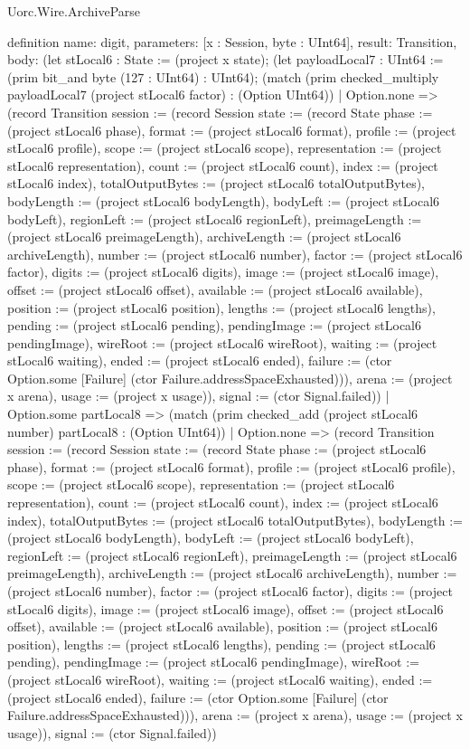 \begin{lexlean}{Uorc.Wire.ArchiveParse}
\begin{semanticmodule}
definition{
  name: digit,
  parameters: [x : Session, byte : UInt64],
  result: Transition,
  body: (let stLocal6 : State := (project x state); (let payloadLocal7 : UInt64 := (prim bit_and byte (127 : UInt64) : UInt64); (match (prim checked_multiply payloadLocal7 (project stLocal6 factor) : (Option UInt64))
    | Option.none => (record Transition {session := (record Session {state := (record State {phase := (project stLocal6 phase), format := (project stLocal6 format), profile := (project stLocal6 profile), scope := (project stLocal6 scope), representation := (project stLocal6 representation), count := (project stLocal6 count), index := (project stLocal6 index), totalOutputBytes := (project stLocal6 totalOutputBytes), bodyLength := (project stLocal6 bodyLength), bodyLeft := (project stLocal6 bodyLeft), regionLeft := (project stLocal6 regionLeft), preimageLength := (project stLocal6 preimageLength), archiveLength := (project stLocal6 archiveLength), number := (project stLocal6 number), factor := (project stLocal6 factor), digits := (project stLocal6 digits), image := (project stLocal6 image), offset := (project stLocal6 offset), available := (project stLocal6 available), position := (project stLocal6 position), lengths := (project stLocal6 lengths), pending := (project stLocal6 pending), pendingImage := (project stLocal6 pendingImage), wireRoot := (project stLocal6 wireRoot), waiting := (project stLocal6 waiting), ended := (project stLocal6 ended), failure := (ctor Option.some [Failure] (ctor Failure.addressSpaceExhausted))}), arena := (project x arena), usage := (project x usage)}), signal := (ctor Signal.failed)})
    | Option.some partLocal8 => (match (prim checked_add (project stLocal6 number) partLocal8 : (Option UInt64))
      | Option.none => (record Transition {session := (record Session {state := (record State {phase := (project stLocal6 phase), format := (project stLocal6 format), profile := (project stLocal6 profile), scope := (project stLocal6 scope), representation := (project stLocal6 representation), count := (project stLocal6 count), index := (project stLocal6 index), totalOutputBytes := (project stLocal6 totalOutputBytes), bodyLength := (project stLocal6 bodyLength), bodyLeft := (project stLocal6 bodyLeft), regionLeft := (project stLocal6 regionLeft), preimageLength := (project stLocal6 preimageLength), archiveLength := (project stLocal6 archiveLength), number := (project stLocal6 number), factor := (project stLocal6 factor), digits := (project stLocal6 digits), image := (project stLocal6 image), offset := (project stLocal6 offset), available := (project stLocal6 available), position := (project stLocal6 position), lengths := (project stLocal6 lengths), pending := (project stLocal6 pending), pendingImage := (project stLocal6 pendingImage), wireRoot := (project stLocal6 wireRoot), waiting := (project stLocal6 waiting), ended := (project stLocal6 ended), failure := (ctor Option.some [Failure] (ctor Failure.addressSpaceExhausted))}), arena := (project x arena), usage := (project x usage)}), signal := (ctor Signal.failed)})
}
\end{semanticmodule}
\end{lexlean}
